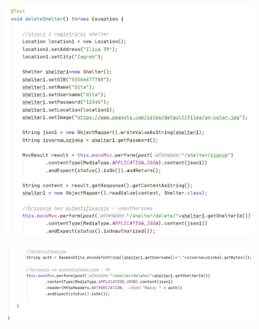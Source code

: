  			\begin{figure}[H]
 					\hspace*{-0.4in}
 					\includegraphics[scale=0.75]{slike/shelter4.1.PNG} %
 				\centering
 			\end{figure}
 			\begin{figure}[H]
 				\hspace*{-0.5in}
 				\includegraphics[scale=0.75]{slike/shelter4.2.PNG} %
 				\centering
 			\end{figure}
 		
 		
 		
